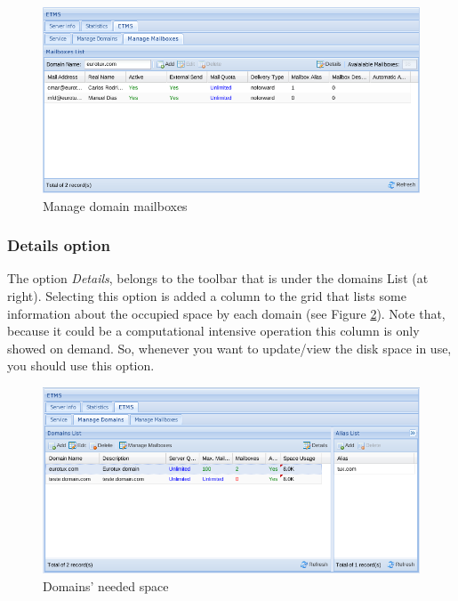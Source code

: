 \begin{figure}[H]
    \begin{center}
    \includegraphics[scale=0.45]{screenshots/etms/etms_gerir_mailboxes.png}
    \caption{Manage domain mailboxes}
    \label{fig:etms_gerir_mailboxes}
    \end{center}
\end{figure}

\subsubsection{Details option}
\label{sec:etms_sub_detalhes_dominio}
The option \textit{Details}, belongs to the toolbar that is under the domains List (at right). Selecting this option is added a column to the grid that lists some information about the occupied space by each domain (see Figure \ref{fig:etms_domain_details}). Note that, because it could be a computational intensive operation this column is only showed on demand. So, whenever you want to update/view the disk space in use, you should use this option.

\begin{figure}[H]
    \begin{center}
    \includegraphics[scale=0.45]{screenshots/etms/etms_domain_details.png}
    \caption{Domains' needed space}
    \label{fig:etms_domain_details}
    \end{center}
\end{figure}

